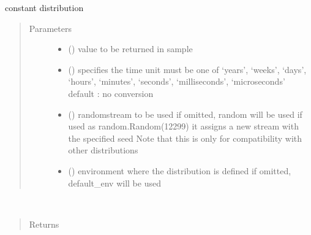 \documentclass[letterpaper,10pt,english]{sphinxmanual}
\begin{document}

\begin{fulllineitems}
\label{\detokenize{Reference:salabim.Constant}}
constant distribution
\begin{quote}\begin{description}
\item[{Parameters}] \leavevmode\begin{itemize}
\item {} 
 () \textendash{} value to be returned in sample

\item {} 
 () \textendash{} specifies the time unit 
must be one of ‘years’, ‘weeks’, ‘days’, ‘hours’, ‘minutes’, ‘seconds’, ‘milliseconds’, ‘microseconds’ 
default : no conversion 

\item {} 
 () \textendash{} randomstream to be used 
if omitted, random will be used 
if used as random.Random(12299)
it assigns a new stream with the specified seed 
Note that this is only for compatibility with other distributions

\item {} 
 ({\hyperref[\detokenize{Reference:salabim.Environment}]{}}) \textendash{} environment where the distribution is defined 
if omitted, default\_env will be used

\end{itemize}

\end{description}\end{quote}

\begin{fulllineitems}
\label{\detokenize{Reference:salabim.Constant.mean}}~\begin{quote}\begin{description}
\item[{Returns}] \leavevmode
{}


\end{description}
\end{quote}
\end{fulllineitems}
\end{fulllineitems}
\end{document}
